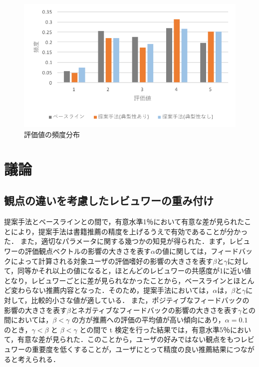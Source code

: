 \documentclass[a4paper,11pt,oneside,openany]{jsbook}
\begin{document}
\begin{figure}[htb]
	\begin{center} %
		\includegraphics [width = 120mm] {figures/result.pdf} %
	\end{center}
	\caption{評価値の頻度分布} %
	\label{fig:result5} %
\end{figure}

	\section{議論}
	\subsection{観点の違いを考慮したレビュワーの重み付け}
提案手法とベースラインとの間で，有意水準1％において有意な差が見られたことにより，提案手法は書籍推薦の精度を上げるうえで有効であることが分かった．
また，適切なパラメータに関する幾つかの知見が得られた．まず，レビュワーの評価観点ベクトルの影響の大きさを表す$\alpha$の値に関しては，フィードバックによって計算される対象ユーザの評価嗜好の影響の大きさを表す$\beta$と$\gamma$に対して，同等かそれ以上の値になると，ほとんどのレビュワーの共感度が1に近い値となり，レビュワーごとに差が見られなかったことから，ベースラインとほとんど変わらない推薦内容となった．そのため，提案手法においては，$\alpha$は，$\beta$と$\gamma$に対して，比較的小さな値が適している．
また，ポジティブなフィードバックの影響の大きさを表す$\beta$とネガティブなフィードバックの影響の大きさを表す$\gamma$との間においては，$\beta < \gamma$ の方が推薦への評価の平均値が高い傾向にあり，$\alpha = 0.1$ のとき，$\gamma < \beta$ と $\beta < \gamma$ との間で t 検定を行った結果では，有意水準5％において，有意な差が見られた．このことから，ユーザの好みではない観点をもつレビュワーの重要度を低くすることが，ユーザにとって精度の良い推薦結果につながると考えられる．
\end{document}
